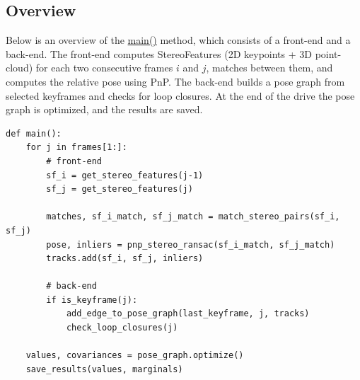 \documentclass[12pt]{article}
\begin{document}
\subsection{Overview}
Below is an overview of the \href{https://github.com/ehud-gordon/VAN_ex/blob/master/src/stereo_slam.py#L56}{main()} method, which consists of a front-end and a back-end. The front-end computes StereoFeatures (2D keypoints + 3D point-cloud) for each two consecutive frames $i$ and $j$, matches between them, and computes the relative pose using PnP. The back-end builds a pose graph from selected keyframes and checks for loop closures. At the end of the drive the pose graph is optimized, and the results are saved.
\begin{tcolorbox} 
\begin{verbatim}
def main():
    for j in frames[1:]:
        # front-end
        sf_i = get_stereo_features(j-1)
        sf_j = get_stereo_features(j)
        
        matches, sf_i_match, sf_j_match = match_stereo_pairs(sf_i, sf_j)
        pose, inliers = pnp_stereo_ransac(sf_i_match, sf_j_match)
        tracks.add(sf_i, sf_j, inliers)
        
        # back-end
        if is_keyframe(j):
            add_edge_to_pose_graph(last_keyframe, j, tracks)
            check_loop_closures(j)    

    values, covariances = pose_graph.optimize()
    save_results(values, marginals)
\end{verbatim} 
\end{tcolorbox}
\end{document}
